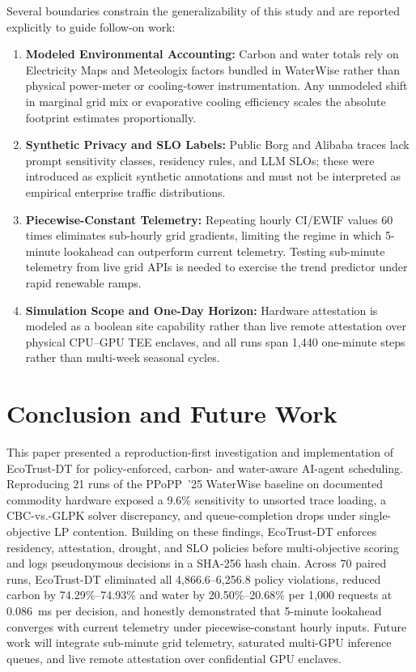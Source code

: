 \documentclass[conference]{IEEEtran}
\begin{document}
Several boundaries constrain the generalizability of this study and are reported explicitly to guide follow-on work:
\begin{enumerate}[leftmargin=*]
    \item \textbf{Modeled Environmental Accounting:} Carbon and water totals rely on Electricity Maps and Meteologix factors bundled in WaterWise rather than physical power-meter or cooling-tower instrumentation. Any unmodeled shift in marginal grid mix or evaporative cooling efficiency scales the absolute footprint estimates proportionally.
    \item \textbf{Synthetic Privacy and SLO Labels:} Public Borg and Alibaba traces lack prompt sensitivity classes, residency rules, and LLM SLOs; these were introduced as explicit synthetic annotations and must not be interpreted as empirical enterprise traffic distributions.
    \item \textbf{Piecewise-Constant Telemetry:} Repeating hourly CI/EWIF values 60 times eliminates sub-hourly grid gradients, limiting the regime in which 5-minute lookahead can outperform current telemetry. Testing sub-minute telemetry from live grid APIs is needed to exercise the trend predictor under rapid renewable ramps.
    \item \textbf{Simulation Scope and One-Day Horizon:} Hardware attestation is modeled as a boolean site capability rather than live remote attestation over physical CPU--GPU TEE enclaves, and all runs span 1,440 one-minute steps rather than multi-week seasonal cycles.
\end{enumerate}

\section{Conclusion and Future Work}
\label{sec:conclusion}

This paper presented a reproduction-first investigation and implementation of EcoTrust-DT for policy-enforced, carbon- and water-aware AI-agent scheduling. Reproducing 21 runs of the PPoPP~'25 WaterWise baseline on documented commodity hardware exposed a 9.6\% sensitivity to unsorted trace loading, a CBC-vs.-GLPK solver discrepancy, and queue-completion drops under single-objective LP contention. Building on these findings, EcoTrust-DT enforces residency, attestation, drought, and SLO policies before multi-objective scoring and logs pseudonymous decisions in a SHA-256 hash chain. Across 70 paired runs, EcoTrust-DT eliminated all 4,866.6--6,256.8 policy violations, reduced carbon by 74.29\%--74.93\% and water by 20.50\%--20.68\% per 1,000 requests at 0.086~ms per decision, and honestly demonstrated that 5-minute lookahead converges with current telemetry under piecewise-constant hourly inputs. Future work will integrate sub-minute grid telemetry, saturated multi-GPU inference queues, and live remote attestation over confidential GPU enclaves.
\end{document}
